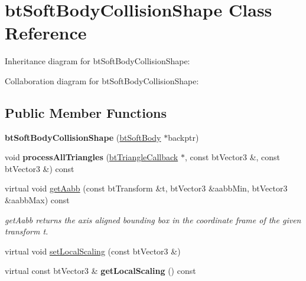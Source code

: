 \hypertarget{classbt_soft_body_collision_shape}{\section{bt\+Soft\+Body\+Collision\+Shape Class Reference}
\label{classbt_soft_body_collision_shape}
}


Inheritance diagram for bt\+Soft\+Body\+Collision\+Shape\+:


Collaboration diagram for bt\+Soft\+Body\+Collision\+Shape\+:
\subsection*{Public Member Functions}
\begin{DoxyCompactItemize}
\item 
\hypertarget{classbt_soft_body_collision_shape_ac631f6b0a0d24af1afbcf7e823f5f631}{{\bfseries bt\+Soft\+Body\+Collision\+Shape} (\hyperlink{classbt_soft_body}{bt\+Soft\+Body} $\ast$backptr)}\label{classbt_soft_body_collision_shape_ac631f6b0a0d24af1afbcf7e823f5f631}

\item 
\hypertarget{classbt_soft_body_collision_shape_a835d8897cf6da94b8551d33a66ffd7a1}{void {\bfseries process\+All\+Triangles} (\hyperlink{classbt_triangle_callback}{bt\+Triangle\+Callback} $\ast$, const bt\+Vector3 \&, const bt\+Vector3 \&) const }\label{classbt_soft_body_collision_shape_a835d8897cf6da94b8551d33a66ffd7a1}

\item 
\hypertarget{classbt_soft_body_collision_shape_a575571e45a8ff26834b39c322b0ef096}{virtual void \hyperlink{classbt_soft_body_collision_shape_a575571e45a8ff26834b39c322b0ef096}{get\+Aabb} (const bt\+Transform \&t, bt\+Vector3 \&aabb\+Min, bt\+Vector3 \&aabb\+Max) const }\label{classbt_soft_body_collision_shape_a575571e45a8ff26834b39c322b0ef096}

\begin{DoxyCompactList}\small\item\em get\+Aabb returns the axis aligned bounding box in the coordinate frame of the given transform t. \end{DoxyCompactList}\item 
virtual void \hyperlink{classbt_soft_body_collision_shape_a4458e1135af76b7ddbaa4befe0bfbc7a}{set\+Local\+Scaling} (const bt\+Vector3 \&)
\item 
\hypertarget{classbt_soft_body_collision_shape_adad69de45750078014dc7913a37c1818}{virtual const bt\+Vector3 \& {\bfseries get\+Local\+Scaling} () const }\label{classbt_soft_body_collision_shape_adad69de45750078014dc7913a37c1818}


\end{DoxyCompactItemize}

